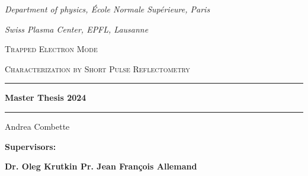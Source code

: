\documentclass[11pt,a4paper,openany]{report}
\author{Andrea}
\begin{document}
\begin{titlepage}
    \begin{center}
        \vspace*{2cm}
        \emph{\footnotesize{Department of physics, École Normale Supérieure, Paris}}

        \emph{\footnotesize{Swiss Plasma Center, EPFL, Lausanne}}


        \vspace*{1cm}

        \textsc{Trapped Electron Mode}

        \textsc{Characterization by Short Pulse Reflectometry}
        \vspace*{1cm}

        \rule{14cm}{2pt}\vspace{.7cm}

        \Large{\textbf{Master Thesis 2024}}

        \vspace{.5cm}
        \rule{14cm}{2pt}
        \vspace{1cm}

        \Large Andrea Combette

        \vspace{3cm}

        \raisebox{-5pt}{\quad\decofourleft\decotwo\decofourright\quad}

        \vspace{2cm}
        \vspace{1cm}

        \begin{minipage}{14cm}
            \small{\textbf{Supervisors:}}
            \vspace{.5cm}

            \small{\textbf{Dr. Oleg Krutkin \null\hfill Pr. Jean François Allemand}}

        \end{minipage}
        \vspace{2cm}



\end{center}
\end{titlepage}
\end{document}
